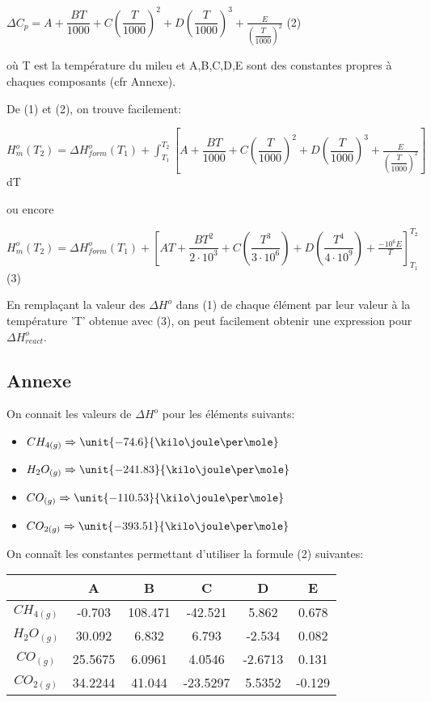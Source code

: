 \documentclass[11pt,a4paper]{report}
\begin{document}
$\Delta C_p=A+\dfrac{BT}{1000}+C(\dfrac{T}{1000})^2+D(\dfrac{T}{1000})^3+\frac{E}{(\dfrac{T}{1000})^2}$        (2)

où T est la température du mileu et A,B,C,D,E sont des constantes propres à chaques composants (cfr Annexe).

De (1) et (2), on trouve facilement:

$H^o_m(T_2)=\Delta H^o_{form}(T_1)+\int_{T_1}^{T_2} [A+\dfrac{BT}{1000}+C(\dfrac{T}{1000})^2+D(\dfrac{T}{1000})^3+\frac{E}{(\dfrac{T}{1000})^2}]$dT

ou encore

$H^o_m(T_2)=\Delta H^o_{form}(T_1) + [AT+\dfrac{BT^2}{2\cdot10^3}+C(\dfrac{T^3}{3\cdot10^6})+D(\dfrac{T^4}{4\cdot10^9})+\frac{-10^6E}{T}]^{T_2}_{T_1}$(3) 

En remplaçant la valeur des $\Delta H^o$ dans (1) de chaque élément par leur valeur à la température 'T' obtenue avec (3), on peut facilement obtenir une expression pour $\Delta H^o_{react}$.


\subsection*{Annexe}
On connait les valeurs de $\Delta H^o$ pour les éléments suivants:
\begin{itemize}
\item{$CH_{4(g)} \Rightarrow \unit{-74.6}{\kilo\joule\per\mole}$}
\item{$H_2O_{(g)} \Rightarrow \unit{-241.83}{\kilo\joule\per\mole}$}
\item{$CO_{(g)} \Rightarrow \unit{-110.53}{\kilo\joule\per\mole}$}
\item{$CO_{2(g)} \Rightarrow \unit{-393.51}{\kilo\joule\per\mole}$}
\end{itemize}

On connaît les constantes permettant d'utiliser la formule (2) suivantes:

\begin{tabular}{|c|c|c|c|c|c|}
\hline 
\rule[-1ex]{0pt}{2.5ex}  & A & B & C & D & E \\ 
\hline 
\rule[-1ex]{0pt}{2.5ex} $CH_{4(g)}$ & -0.703 & 108.471 & -42.521 & 5.862 & 0.678 \\ 
\hline 
\rule[-1ex]{0pt}{2.5ex} $H_2O_{(g)}$ & 30.092 & 6.832 & 6.793 & -2.534 & 0.082 \\ 
\hline 
\rule[-1ex]{0pt}{2.5ex} $CO_{(g)}$ & 25.5675 & 6.0961 & 4.0546 & -2.6713 & 0.131 \\ 
\hline 
\rule[-1ex]{0pt}{2.5ex} $CO_{2(g)}$ & 34.2244 & 41.044 & -23.5297 & 5.5352 & -0.129 \\ 
\hline 
\end{tabular} 
\end{document}
